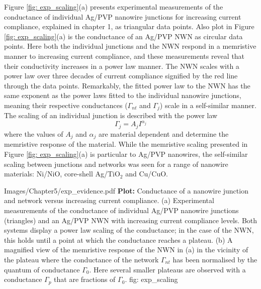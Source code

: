 Figure \ref{fig: exp_scaling}(a) presents experimental measurements of the conductance of individual Ag/PVP nanowire junctions for increasing current compliance, explained in chapter 1, as triangular data points. Also plot in Figure \ref{fig: exp_scaling}(a) is the conductance of an Ag/PVP NWN as circular data points\cite{scaling2018}. Here both the individual junctions and the NWN respond in a memristive manner to increasing current compliance, and these measurements reveal that their conductivity increases in a power law manner. The NWN scales with a power law over three decades of current compliance signified by the red line through the data points. Remarkably, the fitted power law to the NWN has the same exponent as the power laws fitted to the individual nanowire junctions, meaning their respective conductances ($\Gamma_{nt}$ and $\Gamma_{j}$) scale in a self-similar manner. The scaling of an individual junction is described with the power law
\begin{equation}
\Gamma_j = A_j I^{\alpha_j}
\label{eq: junction_pl}
\end{equation}
where the values of $A_j$ and $\alpha_j$ are material dependent and determine the memristive response of the material. While the memristive scaling presented in Figure \ref{fig: exp_scaling}(a) is particular to Ag/PVP nanowires, the self-similar scaling between junctions and networks was seen for a range of nanowire materials: Ni/NiO, core-shell Ag/TiO$_2$ and Cu/CuO\cite{scaling2018}. 

{Images/Chapter5/exp_evidence.pdf}
{\textbf{Plot:} Conductance of a nanowire junction and network versus increasing current compliance.}
{(a) Experimental measurements of the conductance of individual Ag/PVP nanowire junctions (triangles) and an Ag/PVP NWN with increasing current compliance levels. Both systems display a power law scaling of the conductance; in the case of the NWN, this holds until a point at which the conductance reaches a plateau. (b) A magnified view of the memristive response of the NWN in (a) in the vicinity of the plateau where the conductance of the network $\Gamma_{nt}$ has been normalised by the quantum of conductance $\Gamma_0$. Here several smaller plateaus are observed with a conductance $\Gamma_p$ that are fractions of $\Gamma_0$\cite{scaling2018}. }
{fig: exp_scaling}

